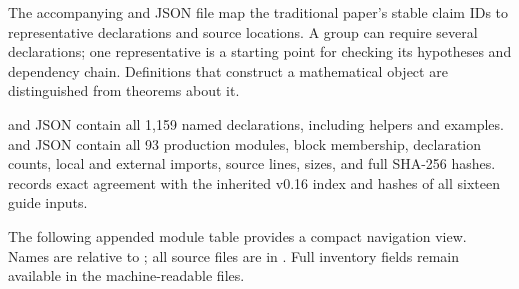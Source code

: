 \documentclass[11pt]{article}
\begin{document}
The accompanying \texttt{}
and JSON file map the traditional paper's stable claim IDs to
representative declarations and source locations. A group can require
several declarations; one representative is a starting point for
checking its hypotheses and dependency chain. Definitions that construct
a mathematical object are distinguished from theorems about it.

\texttt{} and JSON contain
all 1,159 named declarations, including helpers and examples.
\texttt{} and JSON contain all 93
production modules, block membership, declaration counts, local and
external imports, source lines, sizes, and full SHA-256 hashes.
\texttt{} records exact agreement
with the inherited v0.16 index and hashes of all sixteen guide inputs.

The following appended module table provides a compact navigation view.
Names are relative to
\texttt{}; all source
files are in
\texttt{}. Full
inventory fields remain available in the machine-readable files.
\clearpage
\end{document}
